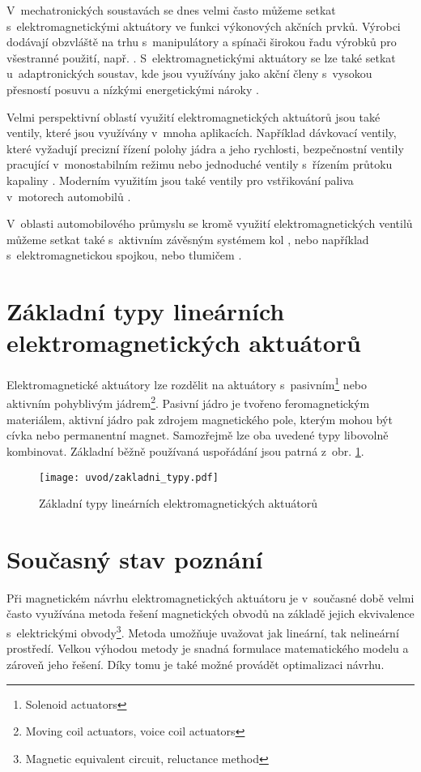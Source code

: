 V~mechatronických soustavách se dnes velmi často můžeme setkat s~elektromagnetickými aktuátory ve funkci výkonových akčních prvků. Výrobci dodávají obzvláště na trhu s~manipulátory a spínači širokou řadu výrobků pro všestranné použití, např. \cite{standardtechnologyinc.com} \cite{etogroup.com}. S~elektromagnetickými aktuátory se lze také setkat u~adaptronických soustav, kde jsou využívány jako akční členy s~vysokou přesností posuvu a nízkými energetickými nároky \cite{4134969} \cite{1252843} \cite{GomisBellmunt2007153} \cite{Lee200024}.

Velmi perspektivní oblastí využití elektromagnetických aktuátorů jsou také ventily, které jsou využívány v~mnoha aplikacích. Například dávkovací ventily, které vyžadují precizní řízení polohy jádra a jeho rychlosti, bezpečnostní ventily pracující v~monostabilním režimu nebo jednoduché ventily s~řízením průtoku kapaliny \cite{nesbitt2011handbook} \cite{5953509}. Moderním využitím jsou také ventily pro vstřikování paliva v~motorech automobilů \cite{1406108} \cite{6531035}.

V~oblasti automobilového průmyslu se kromě využití elektromagnetických ventilů můžeme setkat také s~aktivním závěsným systémem kol \cite{4677555}, nebo například s~elektromagnetickou spojkou, nebo tlumičem \cite{gysen2010active}.


\section{Základní typy lineárních\\ elektromagnetických aktuátorů}
Elektromagnetické aktuátory lze rozdělit na aktuátory s~pasivním\footnote{Solenoid actuators} nebo aktivním pohyblivým jádrem\footnote{Moving coil actuators, voice coil actuators}. Pasivní jádro je tvořeno feromagnetickým materiálem, aktivní jádro pak zdrojem magnetického pole, kterým mohou být cívka nebo permanentní magnet. Samozřejmě lze oba uvedené typy libovolně kombinovat. Základní běžně používaná uspořádání jsou patrná z~obr. \ref{obr:zakladni_typy}. \cite{gomis2010design} \cite{ulrych2009aktuatory}

\begin{figure}[h!]
  \centering
  \texttt{[image: uvod/zakladni\_typy.pdf]}
  \caption{Základní typy lineárních elektromagnetických aktuátorů}
  \label{obr:zakladni_typy}
\end{figure}

\section{Současný stav poznání}
Při magnetickém návrhu elektromagnetických aktuátoru je v~současné době velmi často využívána metoda řešení magnetických obvodů na základě jejich ekvivalence s~elektrickými obvody\footnote{Magnetic equivalent circuit, reluctance method}. Metoda umožňuje uvažovat jak lineární, tak nelineární prostředí. Velkou výhodou metody je snadná formulace matematického modelu a zároveň jeho řešení. Díky tomu je také možné provádět optimalizaci návrhu. \cite{gomis2010design} \cite{4270652}

